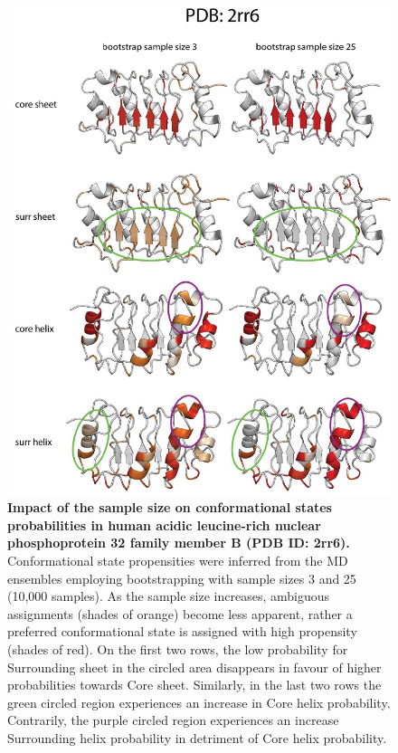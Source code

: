 \begin{figure}[H]
    \centering
    \includegraphics[width=0.8\linewidth]{constava//sup_figs/supfig6.pdf}
    \caption{\textbf{Impact of the sample size on conformational states probabilities in human acidic leucine-rich nuclear phosphoprotein 32 family member B (PDB ID: 2rr6).} Conformational state propensities were inferred from the MD ensembles employing bootstrapping with sample sizes 3 and 25 (10,000 samples). As the sample size increases, ambiguous assignments (shades of orange) become less apparent, rather a preferred conformational state is assigned with high propensity (shades of red). On the first two rows, the low probability for Surrounding sheet in the circled area disappears in favour of higher probabilities towards Core sheet. Similarly, in the last two rows the green circled region experiences an increase in Core helix probability. Contrarily, the purple circled region experiences an increase Surrounding helix probability in detriment of Core helix probability.}
    \label{fig:sup_fig_constava:bootstrap_size}
\end{figure}

